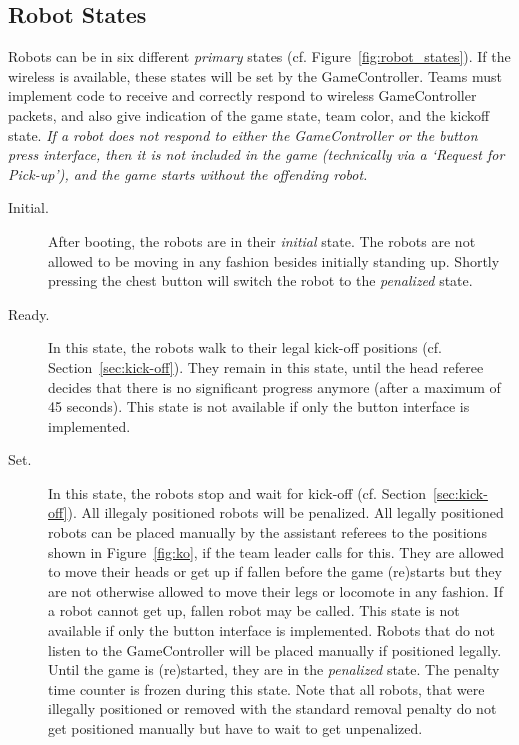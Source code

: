 \documentclass[12pt]{article}
\newcommand{\cf}{\mbox{cf.}\xspace}
\newcommand{\KickOffAutoTime}{45 seconds\xspace}
\begin{document}
\subsection{Robot States}
\label{sec:robot_states}

Robots can be in six different \emph{primary} states (\cf Figure~\ref{fig:robot_states}). If the wireless is available, these states will be set by the GameController. Teams must implement code to receive and correctly respond to wireless GameController packets, and also give indication of the game state, team color, and the kickoff state.
\emph{If a robot does not respond to either the GameController or the button press interface, then it is not included in the game (technically via a `Request for Pick-up'), and the game starts without the offending robot.}

\begin{description}

\item[Initial.] After booting, the robots are in their \emph{initial} state. The robots are not allowed to be moving in any fashion besides initially standing up. Shortly pressing the chest button will switch the robot to the \emph{penalized} state.

\item[Ready.] In this state, the robots walk to their legal kick-off positions (\cf Section~\ref{sec:kick-off}). They remain in this state, until the head referee decides that there is no significant progress anymore (after a maximum of \KickOffAutoTime). This state is not available if only the button interface is implemented.

\item[Set.] In this state, the robots stop and wait for kick-off (\cf Section~\ref{sec:kick-off}). All illegaly positioned robots will be penalized. All legally positioned robots can be placed manually by the assistant referees to the positions shown in Figure~\ref{fig:ko}, if the team leader calls for this. They are allowed to move their heads or get up if fallen before the game (re)starts but they are not otherwise allowed to move their legs or locomote in any fashion. If a robot cannot get up, fallen robot may be called. This state is not available if only the button interface is implemented. Robots that do not listen to the GameController will be placed manually if positioned legally. Until the game is (re)started, they are in the \emph{penalized} state. The penalty time counter is frozen during this state.
Note that all robots, that were illegally positioned or removed with the standard removal penalty do not get positioned manually but have to wait to get unpenalized.


\end{description}
\end{document}
